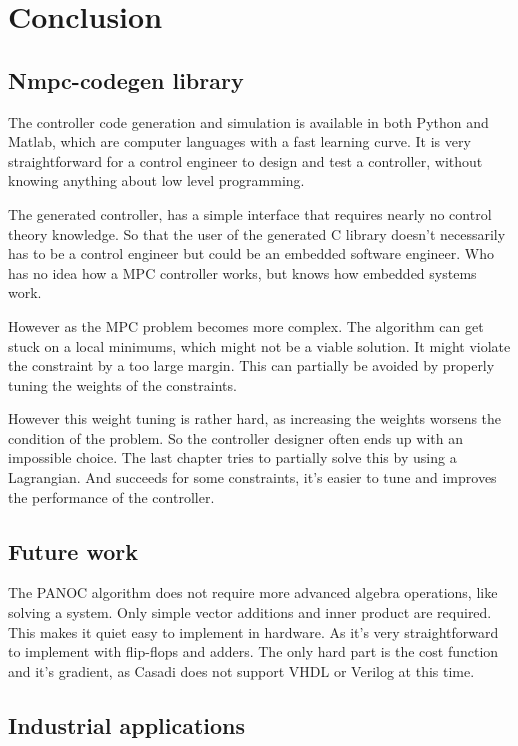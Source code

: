 \chapter{Conclusion}
\label{cha:conclusion}

\section{Nmpc-codegen library}
The controller code generation and simulation is available in both Python and Matlab, which are computer languages with a fast learning curve. It is very straightforward for a control engineer to design and test a controller, without knowing anything about low level programming.

The generated controller, has a simple interface that requires nearly no control theory knowledge. So that the user of the generated C library doesn't necessarily has to be a control engineer but could be an embedded software engineer. Who has no idea how a MPC controller works, but knows how embedded systems work.

However as the MPC problem becomes more complex. The algorithm can get stuck on a local minimums, which might not be a viable solution. It might violate the constraint by a too large margin. This can partially be avoided by properly tuning the weights of the constraints. 

However this weight tuning is rather hard, as increasing the weights worsens the condition of the problem. So the controller designer often ends up with an impossible choice. The last chapter tries to partially solve this by using a Lagrangian. And succeeds for some constraints, it's easier to tune and improves the performance of the controller. 

\section{Future work}
The PANOC algorithm does not require more advanced algebra operations, like solving a system. Only simple vector additions and inner product are required. This makes it quiet easy to implement in hardware. As it's very straightforward to implement with flip-flops and adders. The only hard part is the cost function and it's gradient, as Casadi does not support VHDL or Verilog at this time.

\section{Industrial applications}


